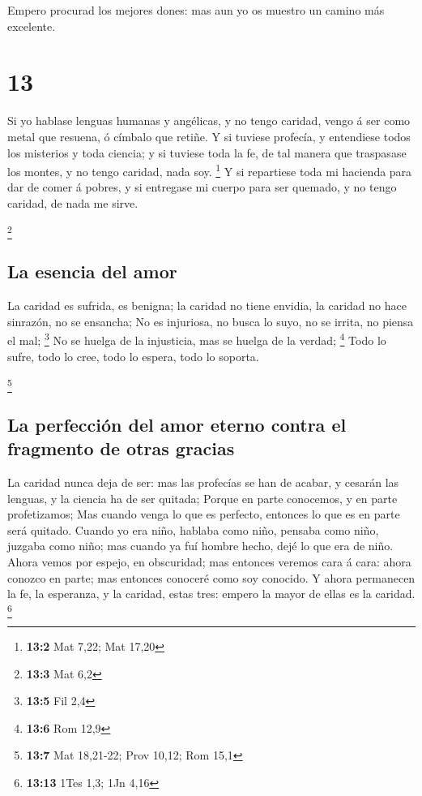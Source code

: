  Empero procurad los mejores dones: mas aun yo os muestro
un camino más excelente.

\hypertarget{section-12}{%
\section{13}\label{section-12}}

 Si yo hablase lenguas humanas y angélicas, y no tengo
caridad, vengo á ser como metal que resuena, ó címbalo que retiñe.
 Y si tuviese profecía, y entendiese todos los misterios y
toda ciencia; y si tuviese toda la fe, de tal manera que traspasase los
montes, y no tengo caridad, nada soy. \footnote{\textbf{13:2} Mat 7,22;
  Mat 17,20}  Y si repartiese toda mi hacienda para dar de
comer á pobres, y si entregase mi cuerpo para ser quemado, y no tengo
caridad, de nada me sirve.

\footnote{\textbf{13:3} Mat 6,2}

\hypertarget{la-esencia-del-amor}{%
\subsection{La esencia del amor}\label{la-esencia-del-amor}}

 La caridad es sufrida, es benigna; la caridad no tiene
envidia, la caridad no hace sinrazón, no se ensancha;  No
es injuriosa, no busca lo suyo, no se irrita, no piensa el mal;
\footnote{\textbf{13:5} Fil 2,4}  No se huelga de la
injusticia, mas se huelga de la verdad; \footnote{\textbf{13:6} Rom 12,9}
 Todo lo sufre, todo lo cree, todo lo espera, todo lo
soporta.

\footnote{\textbf{13:7} Mat 18,21-22; Prov 10,12; Rom 15,1}

\hypertarget{la-perfecciuxf3n-del-amor-eterno-contra-el-fragmento-de-otras-gracias}{%
\subsection{La perfección del amor eterno contra el fragmento de otras
gracias}\label{la-perfecciuxf3n-del-amor-eterno-contra-el-fragmento-de-otras-gracias}}

 La caridad nunca deja de ser: mas las profecías se han de
acabar, y cesarán las lenguas, y la ciencia ha de ser quitada;
 Porque en parte conocemos, y en parte profetizamos;
 Mas cuando venga lo que es perfecto, entonces lo que es
en parte será quitado.  Cuando yo era niño, hablaba como
niño, pensaba como niño, juzgaba como niño; mas cuando ya fuí hombre
hecho, dejé lo que era de niño.  Ahora vemos por espejo,
en obscuridad; mas entonces veremos cara á cara: ahora conozco en parte;
mas entonces conoceré como soy conocido.  Y ahora
permanecen la fe, la esperanza, y la caridad, estas tres: empero la
mayor de ellas es la caridad. \footnote{\textbf{13:13} 1Tes 1,3; 1Jn
  4,16}

